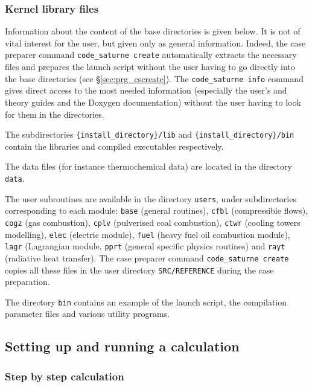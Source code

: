 {{{{{\subsubsection{\CS Kernel library files}
\label{sec:prg_library}%
Information about the content of the \CS base directories is given below. It
is not of vital interest for the user, but given only as general
information. Indeed, the case preparer command \texttt{code\_saturne~create}
automatically extracts the necessary files and prepares the launch script
without the user having to go directly into the \CS base directories
(see \S\ref{sec:prg_cscreate}).
The \texttt{code\_saturne~info} command gives direct
access to the most needed information (especially the user's and theory
guides and the Doxygen documentation) without the user having to look for them in the \CS
directories.

The subdirectories \texttt{\{install\_directory\}/lib} and \texttt{\{install\_directory\}/bin }
contain the libraries and compiled executables respectively.

The data files (for instance thermochemical data) are located in the
directory \texttt{data}.

The user subroutines are available in the directory \texttt{users},
under subdirectories corresponding to each module:
\texttt{base} (general routines),
\texttt{cfbl} (compressible flows),
\texttt{cogz} (gas combustion),
\texttt{cplv} (pulverised coal combustion),
\texttt{ctwr} (cooling towers modelling),
\texttt{elec} (electric module),
\texttt{fuel} (heavy fuel oil combustion module),
\texttt{lagr} (Lagrangian module,
\texttt{pprt} (general specific physics routines) and
\texttt{rayt} (radiative heat transfer).
The case preparer command \texttt{code\_saturne~create} copies all these files
in the user directory \texttt{SRC/REFERENCE} during the case preparation.

The directory \texttt{bin} contains an example of the launch script, the
compilation parameter files and various utility programs.

\subsection{Setting up and running a calculation}

\subsubsection{Step by step calculation}
\label{sec:prg_stepbystepcalculation}%

}}}}}
